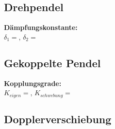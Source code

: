 \documentclass{article}
\begin{document}
\subsection*{Drehpendel}
\textbf{Dämpfungskonstante:}\\
$\delta_1=$, $\delta_2=$

\subsection*{Gekoppelte Pendel}
\textbf{Kopplungsgrade:}\\
$K_{eigen}=$, $K_{schwebung}=$
\subsection*{Dopplerverschiebung}



\end{document}
